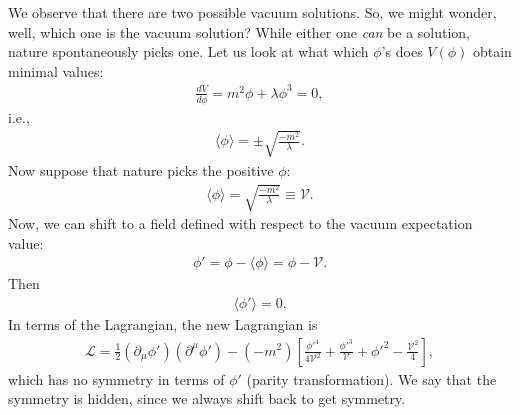 \documentclass[a4paper,11pt]{article}
\numberwithin{equation}{section}
\theoremstyle{definition}
\newcommand{\p}{\partial}
\newcommand{\lag}{\mathcal{L}}
\begin{document}
We observe that there are two possible vacuum solutions. So, we might wonder, well, which one is the vacuum solution? While either one \textit{can} be a solution, nature spontaneously picks one. Let us look at what which $\phi$'s does $V(\phi)$ obtain minimal values:
\begin{align}
\frac{dV}{d\phi} = m^2\phi + \lambda \phi^3 = 0,
\end{align}
i.e.,
\begin{align}
\langle \phi \rangle = \pm \sqrt{\frac{-m^2}{\lambda}}.
\end{align}
Now suppose that nature picks the positive $\phi$:
\begin{align}
\langle \phi \rangle = \sqrt{\frac{-m^2}{\lambda}} \equiv \mathcal{V}.
\end{align}
Now, we can shift to a field defined with respect to the vacuum expectation value:
\begin{align}
\phi' = \phi - \langle \phi \rangle = \phi - \mathcal{V}.
\end{align}
Then 
\begin{align}
\langle \phi' \rangle = 0.
\end{align}
In terms of the Lagrangian, the new Lagrangian is
\begin{align}
\lag = \frac{1}{2}(\p_\mu\phi')(\p^\mu\phi') - (-m^2)\left[ \frac{\phi'^4}{4\mathcal{V}^2} + \frac{\phi'^3}{\mathcal{V}} + \phi'^2 - \frac{\mathcal{V}^2}{4} \right],
\end{align}
which has no symmetry in terms of $\phi'$ (parity transformation). We say that the symmetry is hidden, since we always shift back to get symmetry.\\
\end{document}
